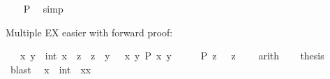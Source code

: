 \begin{isabellebody}
%
\isadelimproof
%
\endisadelimproof
%
\isatagproof
{}\isamarkupfalse%
\isanewline
\ \ \isamarkupfalse%
\ {\isachardoublequoteopen}{\isacharquery}{\kern0pt}P{\isacharparenleft}{\kern0pt}{\isacharbrackleft}{\kern0pt}{\isacharbrackright}{\kern0pt}{\isacharparenright}{\kern0pt}{\isachardoublequoteclose}\ \isamarkupfalse%
\ simp\isanewline
{}\isamarkupfalse%
%
\endisatagproof
{\isafoldproof}%
%
\isadelimproof
%
\endisadelimproof
%
\begin{isamarkuptext}%
Multiple EX easier with forward proof:%
\end{isamarkuptext}\isamarkuptrue%
\isamarkupfalse%
\ \ {\isachardoublequoteopen}{\isasymexists}\ x\ y\ {\isacharcolon}{\kern0pt}{\isacharcolon}{\kern0pt}\ int{\isachardot}{\kern0pt}\ x\ {\isacharless}{\kern0pt}\ z\ {\isacharampersand}{\kern0pt}\ z\ {\isacharless}{\kern0pt}\ y{\isachardoublequoteclose}\ {\isacharparenleft}{\kern0pt}\ {\isachardoublequoteopen}{\isasymexists}\ x\ y{\isachardot}{\kern0pt}\ {\isacharquery}{\kern0pt}P\ x\ y{\isachardoublequoteclose}{\isacharparenright}{\kern0pt}\isanewline
%
\isadelimproof
%
\endisadelimproof
%
\isatagproof
{}\isamarkupfalse%
\ {\isacharminus}{\kern0pt}\isanewline
\ \ \isamarkupfalse%
\ {\isachardoublequoteopen}{\isacharquery}{\kern0pt}P\ {\isacharparenleft}{\kern0pt}z\ {\isacharminus}{\kern0pt}\ {}{\isacharparenright}{\kern0pt}\ {\isacharparenleft}{\kern0pt}z\ {\isacharplus}{\kern0pt}\ {}{\isacharparenright}{\kern0pt}{\isachardoublequoteclose}\ \isamarkupfalse%
\ arith\isanewline
\ \ \isamarkupfalse%
\ {\isacharquery}{\kern0pt}thesis\ \isamarkupfalse%
\ blast\isanewline
{}\isamarkupfalse%
%
\endisatagproof
{\isafoldproof}%
%
\isadelimproof
%
\endisadelimproof
%
\isadelimdocument
%
\endisadelimdocument
%
\isatagdocument
%
\isamarkuptrue%
%
\endisatagdocument
{\isafolddocument}%
%
\isadelimdocument
%
\endisadelimdocument
{}\isamarkupfalse%
\ \ {\isachardoublequoteopen}x\ {\isacharless}{\kern0pt}\ {\isacharparenleft}{\kern0pt}{}{\isacharcolon}{\kern0pt}{\isacharcolon}{\kern0pt}int{\isacharparenright}{\kern0pt}{\isachardoublequoteclose}\ \ {\isachardoublequoteopen}x{\isacharasterisk}{\kern0pt}x\ {\isachargreater}{\kern0pt}\ {}{\isachardoublequoteclose}\isanewline
%
\isadelimproof
%
\endisadelimproof
%
\isatagproof

\end{isabellebody}

